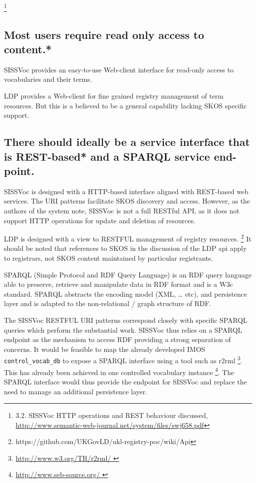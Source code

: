 \documentclass[10pt,a4paper]{article}
\begin{document}
\begin{flushleft}
    \footnote { 3.2. SISSVoc HTTP operations and REST behaviour discussed,
  \url{http://www.semantic-web-journal.net/system/files/swj658.pdf} }


\subsection{ 
  Most users require read only access to content.* 
}
  \item SISSVoc provides an easy-to-use Web-client interface for read-only access to 
  vocabularies and their terms. 
 
  \item LDP provides a Web-client for fine grained registry management of term
resources. But this is a believed to be a general capability lacking SKOS specific support.


\subsection{ 
  There should ideally be a service interface that is REST-based* and a 
  SPARQL service end-point.
}

     \item SISSVoc is designed with a HTTP-based interface aligned with
  REST-based web services. The URI patterns facilitate SKOS discovery and access.
  However, as the authors of the system note, SISSVoc is not a full RESTful API, as 
  it does not support HTTP operations for update and deletion of resources.
      
    \item  LDP is designed with a view to RESTFUL management of registry
  resources.  \footnote { https://github.com/UKGovLD/ukl-registry-poc/wiki/Api }
  It should be noted that references to SKOS in the discussion of the LDP api
  apply to registrars, not SKOS content maintained by particular registrants.  

      \item SPARQL (Simple Protocol and RDF Query Language) is an RDF query
  language able to preserve, retrieve and manipulate data in RDF format and is a
  W3c standard.  SPARQL abstracts the encoding model (XML, … etc), and
  persistence layer and is adapted to the non-relational / graph structure of
  RDF.

   \item   The SISSVoc RESTFUL URI patterns correspond closely with
  specific SPARQL queries which perform the substantial work. SISSVoc thus relies
  on a SPARQL endpoint as the mechanism to access RDF providing a strong
  separation of concerns. It would be feasible to map the already developed IMOS
  \texttt{control\_vocab\_db} to expose a SPARQL interface using a tool such as
  r2rml \footnote{ \url{ http://www.w3.org/TR/r2rml/ } }. This has already been
  achieved in one controlled vocabulary instance \footnote{ \url{ http://www.seb-source.org/ } }. 
  The SPARQL interface would thus provide the endpoint for SISSVoc and replace the 
  need to manage an additional persistence layer.


\end{flushleft}
\end{document}
